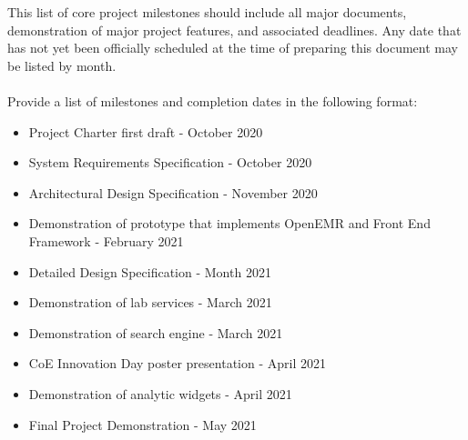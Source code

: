 This list of core project milestones should include all major documents, demonstration of major project features, and associated deadlines. Any date that has not yet been officially scheduled at the time of preparing this document may be listed by month.
\\
\\
Provide a list of milestones and completion dates in the following format:
\begin{itemize}
  \item Project Charter first draft - October 2020
  \item System Requirements Specification - October 2020
  \item Architectural Design Specification - November 2020
  \item Demonstration of prototype that implements OpenEMR and Front End Framework - February 2021
  \item Detailed Design Specification - Month 2021
  \item Demonstration of lab services - March 2021
  \item Demonstration of search engine - March 2021
  \item CoE Innovation Day poster presentation - April 2021
  \item Demonstration of analytic widgets - April 2021
  \item Final Project Demonstration - May 2021
\end{itemize}